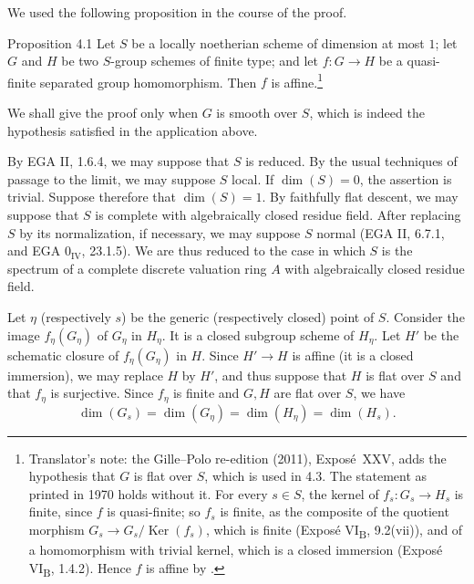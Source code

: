 
We used the following proposition in the course of the proof.

\begin{sgastatement}{Proposition 4.1}
Let \(S\) be a locally noetherian scheme of dimension at most \(1\);
let \(G\) and \(H\) be two \(S\)-group schemes of finite type; and let
\(f\colon G\to H\) be a quasi-finite separated group homomorphism.
Then \(f\) is affine.\footnote{Translator's note: the Gille--Polo re-edition (2011), Exposé~XXV, adds the
hypothesis that \(G\) is flat over \(S\), which is used in 4.3. The statement
as printed in 1970 holds without it. For every \(s\in S\), the kernel of
\(f_s\colon G_s\to H_s\) is finite, since \(f\) is quasi-finite; so \(f_s\) is
finite, as the composite of the quotient morphism
\(G_s\to G_s/\operatorname{Ker}(f_s)\), which is finite (Exposé
VI\textsubscript{B}, 9.2(vii)), and of a homomorphism with trivial kernel,
which is a closed immersion (Exposé VI\textsubscript{B}, 1.4.2). Hence \(f\)
is affine by .}
\end{sgastatement}

We shall give the proof only when \(G\) is smooth over \(S\), which is
indeed the hypothesis satisfied in the application above.


By EGA II, 1.6.4, we may suppose that \(S\) is reduced. By the usual
techniques of passage to the limit, we may suppose \(S\) local. If
\(\dim(S)=0\), the assertion is trivial.
Suppose therefore that \(\dim(S)=1\). By faithfully flat descent, we may
suppose that \(S\) is complete with algebraically closed residue field.
After replacing \(S\) by its normalization, if
necessary, we may suppose \(S\) normal (EGA II, 6.7.1, and
EGA \(0_{\mathrm{IV}}\), 23.1.5).
We are thus reduced to the case in which \(S\) is the spectrum of a
complete discrete valuation ring \(A\) with algebraically closed
residue field.


Let \(\eta\) (respectively \(s\)) be the generic (respectively closed)
point of \(S\). Consider the image \(f_\eta(G_\eta)\) of \(G_\eta\)
in \(H_\eta\). It is a closed subgroup scheme of \(H_\eta\). Let
\(H'\) be the schematic closure of \(f_\eta(G_\eta)\) in \(H\).
Since \(H'\to H\) is affine (it is a closed immersion), we may replace
\(H\) by \(H'\), and thus suppose that \(H\) is flat over \(S\) and
that \(f_\eta\) is surjective. Since \(f_\eta\) is finite and \(G,H\)
are flat over \(S\), we have
\[
 \dim(G_s)=\dim(G_\eta)=\dim(H_\eta)=\dim(H_s).
\]

